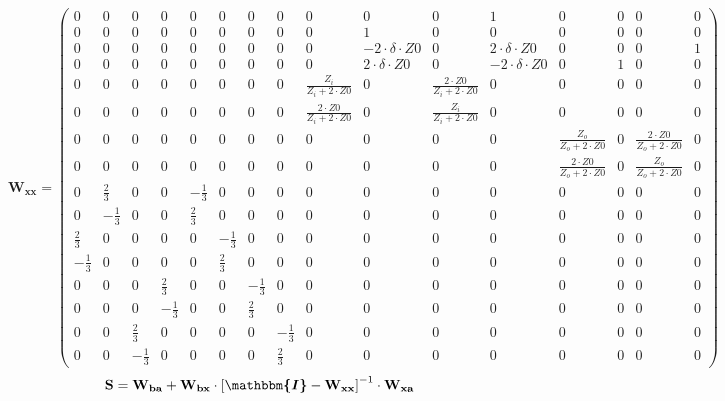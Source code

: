 \[ \mathbf{W_{xx}} = \left(\begin{smallmatrix} 0 & 0 & 0 & 0 & 0 & 0 &
0 & 0 & 0 & 0 & 0 & 1 & 0 & 0 & 0 & 0 \\ 0 & 0 & 0 & 0 & 0 & 0 & 0 & 0
& 0 & 1 & 0 & 0 & 0 & 0 & 0 & 0 \\ 0 & 0 & 0 & 0 & 0 & 0 & 0 & 0 & 0 &
-2\cdot \delta \cdot Z0 & 0 & 2\cdot \delta \cdot Z0 & 0 & 0 & 0 & 1
\\ 0 & 0 & 0 & 0 & 0 & 0 & 0 & 0 & 0 & 2\cdot \delta \cdot Z0 & 0 &
-2\cdot \delta \cdot Z0 & 0 & 1 & 0 & 0 \\ 0 & 0 & 0 & 0 & 0 & 0 & 0 &
0 & \frac{Z_i}{Z_i+2\cdot Z0} & 0 & \frac{2\cdot Z0}{Z_i+2\cdot Z0} &
0 & 0 & 0 & 0 & 0 \\ 0 & 0 & 0 & 0 & 0 & 0 & 0 & 0 & \frac{2\cdot
Z0}{Z_i+2\cdot Z0} & 0 & \frac{Z_i}{Z_i+2\cdot Z0} & 0 & 0 & 0 & 0 & 0
\\ 0 & 0 & 0 & 0 & 0 & 0 & 0 & 0 & 0 & 0 & 0 & 0 &
\frac{Z_o}{Z_o+2\cdot Z0} & 0 & \frac{2\cdot Z0}{Z_o+2\cdot Z0} & 0 \\
0 & 0 & 0 & 0 & 0 & 0 & 0 & 0 & 0 & 0 & 0 & 0 & \frac{2\cdot
Z0}{Z_o+2\cdot Z0} & 0 & \frac{Z_o}{Z_o+2\cdot Z0} & 0 \\ 0 &
\frac{2}{3} & 0 & 0 & -\frac{1}{3} & 0 & 0 & 0 & 0 & 0 & 0 & 0 & 0 & 0
& 0 & 0 \\ 0 & -\frac{1}{3} & 0 & 0 & \frac{2}{3} & 0 & 0 & 0 & 0 & 0
& 0 & 0 & 0 & 0 & 0 & 0 \\ \frac{2}{3} & 0 & 0 & 0 & 0 & -\frac{1}{3}
& 0 & 0 & 0 & 0 & 0 & 0 & 0 & 0 & 0 & 0 \\ -\frac{1}{3} & 0 & 0 & 0 &
0 & \frac{2}{3} & 0 & 0 & 0 & 0 & 0 & 0 & 0 & 0 & 0 & 0 \\ 0 & 0 & 0 &
\frac{2}{3} & 0 & 0 & -\frac{1}{3} & 0 & 0 & 0 & 0 & 0 & 0 & 0 & 0 & 0
\\ 0 & 0 & 0 & -\frac{1}{3} & 0 & 0 & \frac{2}{3} & 0 & 0 & 0 & 0 & 0
& 0 & 0 & 0 & 0 \\ 0 & 0 & \frac{2}{3} & 0 & 0 & 0 & 0 & -\frac{1}{3}
& 0 & 0 & 0 & 0 & 0 & 0 & 0 & 0 \\ 0 & 0 & -\frac{1}{3} & 0 & 0 & 0 &
0 & \frac{2}{3} & 0 & 0 & 0 & 0 & 0 & 0 & 0 & 0
\end{smallmatrix}\right) \]
\[ \mathbf{S}=\mathbf{W_{ba}}+\mathbf{W_{bx}}\cdot\left[
\boldsymbol{\mathbbm{I}}
-\mathbf{W_{xx}}\right]^{-1}\cdot\mathbf{W_{xa}} \]
